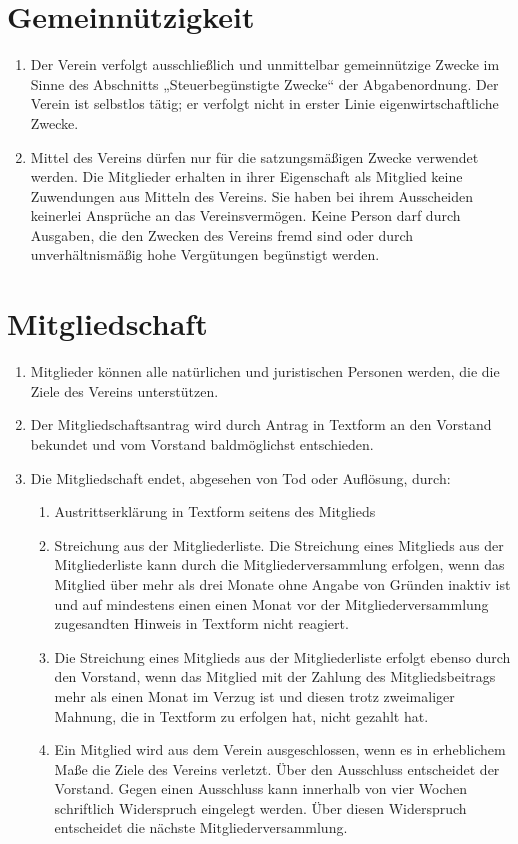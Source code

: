 \documentclass{article}
\begin{document}
\section{Gemeinnützigkeit} 
\label{sec:gemeinnuetzigkeit}  
\begin{enumerate}
\item Der Verein verfolgt ausschließlich und unmittelbar gemeinnützige Zwecke im Sinne des Abschnitts „Steuerbegünstigte Zwecke“ der Abgabenordnung. Der Verein ist selbstlos tätig; er verfolgt nicht in erster Linie eigenwirtschaftliche Zwecke.
\item Mittel des Vereins dürfen nur für die satzungsmäßigen Zwecke verwendet werden. Die Mitglieder erhalten in ihrer Eigenschaft als Mitglied keine Zuwendungen aus Mitteln des Vereins. Sie haben bei ihrem Ausscheiden keinerlei Ansprüche an das Vereinsvermögen. Keine Person darf durch Ausgaben, die den Zwecken des Vereins fremd sind oder durch unverhältnismäßig hohe Vergütungen begünstigt werden.
\end{enumerate}

\section{Mitgliedschaft}
\label{sec:mitgliedschaft}
\begin{enumerate}
\item Mitglieder können alle natürlichen und juristischen Personen werden, die die Ziele des Vereins unterstützen.
\item Der Mitgliedschaftsantrag wird durch Antrag in Textform an den Vorstand bekundet und vom Vorstand baldmöglichst entschieden.
\item Die Mitgliedschaft endet, abgesehen von Tod oder Auflösung, durch:
	\begin{enumerate}
		\item Austrittserklärung in Textform seitens des Mitglieds
		\item Streichung aus der Mitgliederliste. Die Streichung eines Mitglieds aus der  Mitgliederliste kann durch die Mitgliederversammlung erfolgen, wenn das Mitglied über mehr als drei Monate ohne Angabe von Gründen inaktiv ist und auf mindestens einen einen Monat vor der Mitgliederversammlung zugesandten Hinweis in Textform nicht reagiert.
		\item Die Streichung eines Mitglieds aus der Mitgliederliste erfolgt ebenso durch den Vorstand, wenn das Mitglied mit der Zahlung des Mitgliedsbeitrags mehr als einen Monat im Verzug ist und diesen trotz zweimaliger Mahnung, die in Textform zu erfolgen hat, nicht gezahlt hat.
		\item Ein Mitglied wird aus dem Verein ausgeschlossen, wenn es in erheblichem Maße die Ziele des Vereins verletzt. Über den Ausschluss entscheidet der Vorstand. Gegen einen Ausschluss kann innerhalb von vier Wochen schriftlich Widerspruch eingelegt werden. Über diesen Widerspruch entscheidet die nächste Mitgliederversammlung.
	\end{enumerate}


\end{enumerate}
\end{document}
